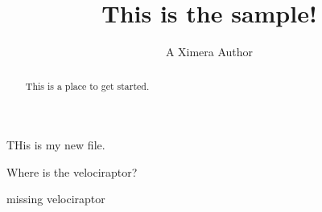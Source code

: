 \documentclass[handout]{ximera}
\title{This is the sample!}
\author{A Ximera Author}
\begin{document}
\begin{abstract}
  This is a place to get started.
\end{abstract}


\maketitle

THis is my new file.

\begin{problem} Where is the velociraptor?
\begin{multipleChoice}
\end{multipleChoice}
\end{problem}

\begin{problem}
\begin{selectAll}
\choice[correct] missing velociraptor
\end{selectAll}
\end{problem}



\end{document}
